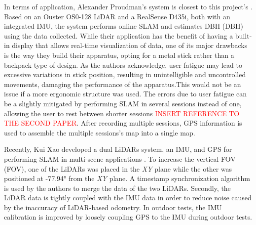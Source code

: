 In terms of application, Alexander Proudman's system is closest to this project's \cite{proudman_online_2021}. Based on an Ouster OS0-128 \acs{LiDAR} and a RealSense D435i, both with an integrated \acs{IMU}, the system performs online \acs{SLAM} and estimates \acl{DBH} (\acs*{DBH}) using the data collected. While their application has the benefit of having a built-in display that allows real-time visualization of data, one of its major drawbacks is the way they build their apparatus, opting for a metal stick rather than a backpack type of design. As the authors acknowledge, user fatigue may lead to excessive variations in stick position, resulting in unintelligible and uncontrolled movements, damaging the performance of the apparatus.This would not be an issue if a more ergonomic structure was used. The errors due to user fatigue can be a slightly mitigated by performing \acs{SLAM} in several sessions instead of one, allowing the user to rest between shorter sessions \textcolor{red}{INSERT REFERENCE TO THE SECOND PAPER}. After recording multiple sessions, \acs*{GPS} information is used to assemble the multiple sessions's map into a single map.

Recently, Kui Xao developed a dual \acs*{LiDAR}s system, an \acs*{IMU}, and \acs*{GPS} for performing \acs*{SLAM} in multi-scene applications \cite{xiao_high-precision_2022}. To increase the vertical \acl*{FOV} (\acs*{FOV}), one of the \acs*{LiDAR}s was placed in the \textit{XY} plane while the other was positioned at -77.94° from the \textit{XY} plane. A timestamp synchronization algorithm is used by the authors to merge the data of the two \acs*{LiDAR}s. Secondly, the \acs*{LiDAR} data is tightly coupled with the IMU data in order to reduce noise caused by the inaccuracy of \acs*{LiDAR}-based odometry. In outdoor tests, the \acs*{IMU} calibration is improved by loosely coupling \acs*{GPS} to the \acs*{IMU} during outdoor tests.